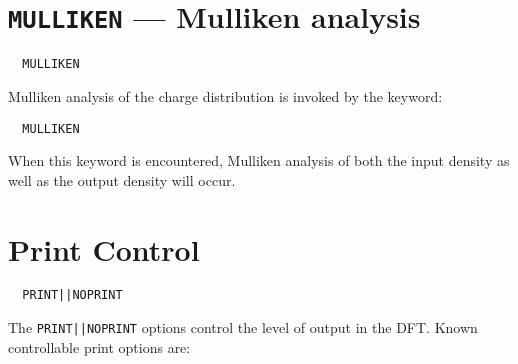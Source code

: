 \section{{\tt MULLIKEN} --- Mulliken analysis}
\begin{verbatim}
  MULLIKEN
\end{verbatim}

Mulliken analysis of the charge distribution is invoked by the keyword:
\begin{verbatim}
  MULLIKEN
\end{verbatim}
When this keyword is encountered, Mulliken analysis of both the input 
density as well as the output density will occur.

\section{Print Control}
\begin{verbatim}
  PRINT||NOPRINT
\end{verbatim}

The \verb+PRINT||NOPRINT+ options control the level of output in the
DFT.  Known controllable print options are:

